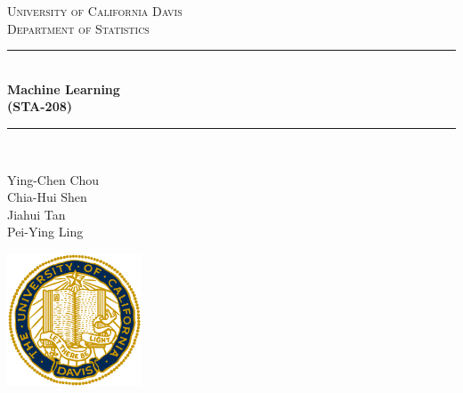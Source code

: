 \documentclass[12pt]{article}
\begin{document}
\begin{titlepage}

\newcommand{\HRule}{\rule{\linewidth}{0.5mm}} %

\center %
 

\textsc{\LARGE University of California Davis }\\[0.3cm] 
\textsc{\Large Department of Statistics}\\[0.5cm] 


\HRule \\[0.4cm]
{ \huge \bfseries Machine Learning\\  (STA-208)}\\[0.03cm]
\HRule \\[1.5cm]

\hfill \break \hfill \break \hfill \break
\hfill \break \hfill \break \hfill \break 
\hfill \break \hfill \break \hfill \break
\hfill \break

{\large Ying-Chen Chou \\ Chia-Hui Shen \\Jiahui Tan\\ Pei-Ying Ling}

\includegraphics[width=4cm]{logo.png}\\[1cm] 
 

\vfill %

\end{titlepage}

\newpage
\tableofcontents
\newpage
\end{document}
